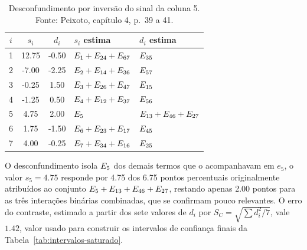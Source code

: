 \documentclass{doeapostila}
\begin{document}
\begin{table}[H]
  \centering
  \caption{Desconfundimento por inversão do sinal da coluna 5. Fonte:
    Peixoto, capítulo 4, p.~39 a 41.}
  \label{tab:dobramento}
  \footnotesize
  \begin{tabular}{c S[table-format=2.2] S[table-format=2.2] l l}
    \toprule
    $i$ & {$s_{i}$} & {$d_{i}$} & $s_{i}$ estima & $d_{i}$ estima \\
     & 12.75 & -0.50 & $E_{1}+E_{24}+E_{67}$ & $E_{35}$ \\
    2 & -7.00 & -2.25 & $E_{2}+E_{14}+E_{36}$ & $E_{57}$ \\
    3 & -0.25 & 1.50  & $E_{3}+E_{26}+E_{47}$ & $E_{15}$ \\
    4 & -1.25 & 0.50  & $E_{4}+E_{12}+E_{37}$ & $E_{56}$ \\
    5 & 4.75  & 2.00  & $E_{5}$                          & $E_{13}+E_{46}+E_{27}$ \\
    6 & 1.75  & -1.50 & $E_{6}+E_{23}+E_{17}$ & $E_{45}$ \\
    7 & 4.00  & -0.25 & $E_{7}+E_{34}+E_{16}$ & $E_{25}$ \\
    \bottomrule
  \end{tabular}
\end{table}

O desconfundimento isola $E_{5}$ dos demais termos que o acompanhavam em
$e_{5}$, o valor $s_{5} = \num{4.75}$ responde por \num{4.75} dos \num{6.75}
pontos percentuais originalmente atribuídos ao conjunto
$E_{5}+E_{13}+E_{46}+E_{27}$, restando apenas \num{2.00}
pontos para as três interações binárias combinadas, que se confirmam pouco
relevantes. O erro do contraste, estimado a partir dos sete valores de
$d_{i}$ por $S_{C} = \sqrt{\sum d_{i}^{2}/7}$, vale $\num{1.42}$, valor usado
para construir os intervalos de confiança finais da
Tabela~\ref{tab:intervalos-saturado}.
\end{document}
